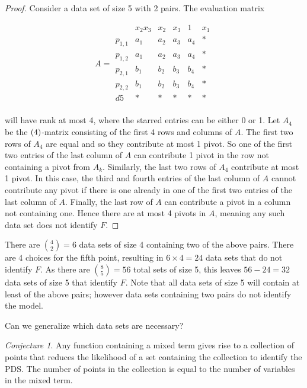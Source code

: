 \documentclass{amsart}
\theoremstyle{definition}
\theoremstyle{remark}
\theoremstyle{example}
\theoremstyle{conjecture}
\newtheorem{conjecture}[thm]{Conjecture}
\numberwithin{equation}{section}
\begin{document}
\begin{proof}
Consider a data set of size 5 with 2 pairs.  The evaluation matrix

$$A=
  \begin{array}{c|ccccc}
     & x_2x_3 & x_2 & x_3 & 1 & x_1 \\
     \hline
    p_{1,1} & a_1 & a_2 & a_3 & a_4 & * \\
    p_{1,2} & a_1 & a_2 & a_3 & a_4 & * \\
    p_{2,1} & b_1 & b_2 & b_3 & b_4 & * \\
    p_{2,2} & b_1 & b_2 & b_3 & b_4 & * \\
    d5 & * & * & * & * & * \\
  \end{array}$$

will have rank at most 4, where the starred entries can be either 0
or 1. Let $A_4$ be the $(4\time 4)$-matrix consisting of the first 4
rows and columns of $A$.  The first two rows of $A_4$ are equal and
so they contribute at most 1 pivot. So one of the first two entries
of the last column of $A$ can contribute 1 pivot in the row not
containing a pivot from $A_k$. Similarly, the last two rows of $A_4$
contribute at most 1 pivot. In this case, the third and fourth
entries of the last column of $A$ cannot contribute any pivot if
there is one already in one of the first two entries of the last
column of $A$. Finally, the last row of $A$ can contribute a pivot
in a column not containing one. Hence there are at most 4 pivots in
$A$, meaning any such data set does not identify $F$.
\end{proof}


There are ${4 \choose 2}=6$ data sets of size 4 containing two of
the above pairs.  There are 4 choices for the fifth point, resulting
in $6\times 4=24$ data sets that do not identify $F$.  As there are
${8 \choose 5}=56$ total sets of size 5, this leaves $56-24 = 32$
data sets of size 5 that identify $F$.  Note that all data
sets of size 5 will contain at least of the above pairs; however
data sets containing two pairs do not identify the model.

Can we generalize which data sets are necessary?
\begin{conjecture}
Any function containing a mixed term gives rise to a
collection of points that reduces the likelihood of a set containing
the collection to identify the PDS.  The number of points in the
collection is equal to the number of variables in the mixed term.
\end{conjecture}
\end{document}
